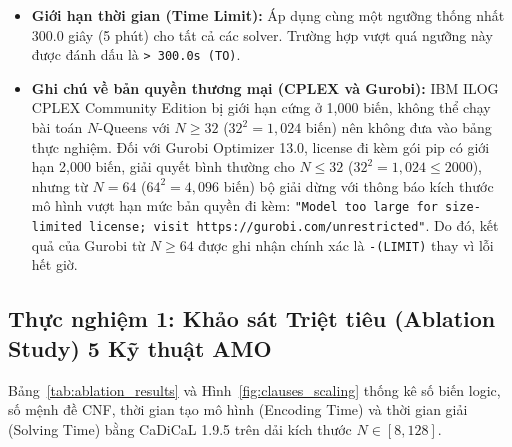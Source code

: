 \documentclass[11pt,a4paper]{article}
\begin{document}
\begin{itemize}
\begin{itemize}
          \item \textbf{Giới hạn thời gian (Time Limit):} Áp dụng cùng một ngưỡng thống nhất 300.0 giây (5 phút) cho tất cả các solver. Trường hợp vượt quá ngưỡng này được đánh dấu là \texttt{> 300.0s (TO)}.
          \item \textbf{Ghi chú về bản quyền thương mại (CPLEX và Gurobi):} IBM ILOG CPLEX Community Edition bị giới hạn cứng ở 1,000 biến, không thể chạy bài toán $N$-Queens với $N \ge 32$ ($32^2 = 1,024$ biến) nên không đưa vào bảng thực nghiệm. Đối với Gurobi Optimizer 13.0, license đi kèm gói pip có giới hạn 2,000 biến, giải quyết bình thường cho $N \le 32$ ($32^2 = 1,024 \le 2000$), nhưng từ $N = 64$ ($64^2 = 4,096$ biến) bộ giải dừng với thông báo kích thước mô hình vượt hạn mức bản quyền đi kèm: \texttt{"Model too large for size-limited license; visit https://gurobi.com/unrestricted"}. Do đó, kết quả của Gurobi từ $N \ge 64$ được ghi nhận chính xác là \texttt{-(LIMIT)} thay vì lỗi hết giờ.
      \end{itemize}
\end{itemize}

\subsection{Thực nghiệm 1: Khảo sát Triệt tiêu (Ablation Study) 5 Kỹ thuật AMO}
Bảng~\ref{tab:ablation_results} và Hình~\ref{fig:clauses_scaling} thống kê số biến logic, số mệnh đề CNF, thời gian tạo mô hình (Encoding Time) và thời gian giải (Solving Time) bằng CaDiCaL 1.9.5 trên dải kích thước $N \in [8, 128]$.
\end{document}
